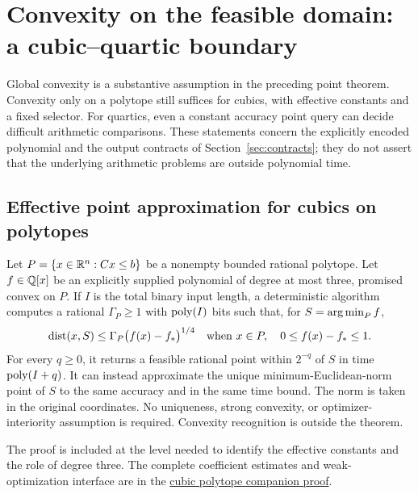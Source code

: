 \section{Convexity on the feasible domain: a cubic--quartic boundary}
\label{sec:domain-boundary}

Global convexity is a substantive assumption in the preceding point
theorem. Convexity only on a polytope still suffices for cubics, with
effective constants and a fixed selector. For quartics, even a constant
accuracy point query can decide difficult arithmetic comparisons. These
statements concern the explicitly encoded polynomial and the output
contracts of Section~\ref{sec:contracts}; they do not assert that the
underlying arithmetic problems are outside polynomial time.

\subsection{Effective point approximation for cubics on polytopes}

\begin{theorem}
\label{thm:cubic-domain}
Let $P=\{x\in\mathbb R^n:Cx\le b\}$ be a nonempty bounded rational
polytope. Let $f\in\mathbb Q[x]$ be an explicitly supplied polynomial of
degree at most three, promised convex on $P$. If $I$ is the total
binary input length, a deterministic algorithm computes a rational
$\Gamma_P\ge1$ with $\operatorname{poly}(I)$ bits such that, for
$S=\operatorname*{arg\,min}_P f$,
\begin{equation}
 \operatorname{dist}(x,S)\le\Gamma_P\bigl(f(x)-f_*\bigr)^{1/4}
 \quad\text{when }x\in P,\quad0\le f(x)-f_*\le1.
 \label{eq:cubic-error}
\end{equation}
For every $q\ge0$, it returns a feasible rational point within
$2^{-q}$ of $S$ in time $\operatorname{poly}(I+q)$. It can instead approximate the
unique minimum-Euclidean-norm point of $S$ to the same accuracy and in
the same time bound. The norm is taken in the original coordinates.
No uniqueness, strong convexity, or optimizer-interiority assumption
is required. Convexity recognition is outside the theorem.
\end{theorem}

The proof is included at the level needed to identify the effective
constants and the role of degree three. The complete coefficient
estimates and weak-optimization interface are in the
\href{../../research-20261002/new-direction/convex-cubic-polytope-point-oracle.md}{cubic polytope companion proof}.

